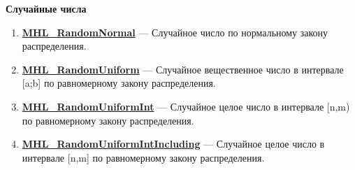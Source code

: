 \documentclass[a4paper,12pt]{article}
\begin{document}
\textbf{Случайные числа}
\begin{enumerate}

\item \textbf{\hyperref[MHL_RandomNormal]{MHL\_RandomNormal}} --- Случайное число по нормальному закону распределения.

\item \textbf{\hyperref[MHL_RandomUniform]{MHL\_RandomUniform}} --- Случайное вещественное число в интервале [a;b] по равномерному закону распределения.

\item \textbf{\hyperref[MHL_RandomUniformInt]{MHL\_RandomUniformInt}} --- Случайное целое число в интервале [n,m) по равномерному закону распределения.

\item \textbf{\hyperref[MHL_RandomUniformIntIncluding]{MHL\_RandomUniformIntIncluding}} --- Случайное целое число в интервале [n,m] по равномерному закону распределения.

\end{enumerate}
\end{document}
